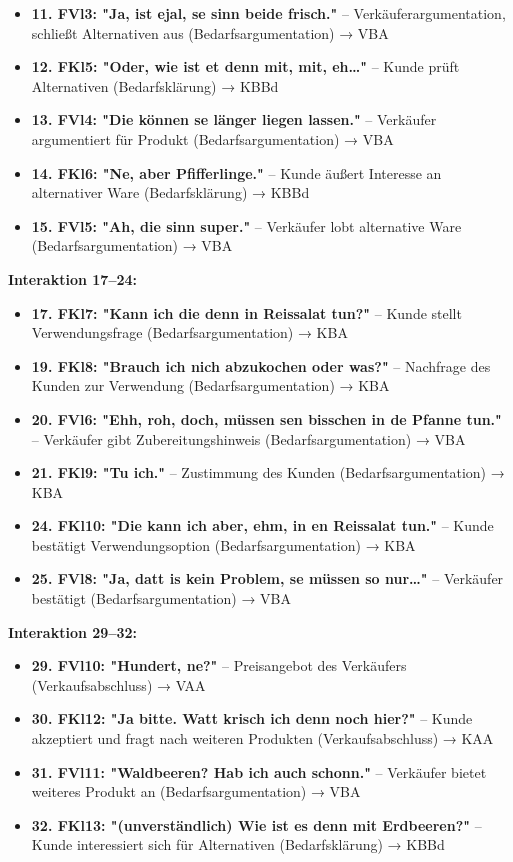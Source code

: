 \documentclass[
]{article}
\begin{document}
\begin{itemize}
\item
  \textbf{11. FVl3: "Ja, ist ejal, se sinn beide frisch."} --
  Verkäuferargumentation, schließt Alternativen aus
  (Bedarfsargumentation) → VBA
\item
  \textbf{12. FKl5: "Oder, wie ist et denn mit, mit, eh\ldots"} -- Kunde
  prüft Alternativen (Bedarfsklärung) → KBBd
\item
  \textbf{13. FVl4: "Die können se länger liegen lassen."} -- Verkäufer
  argumentiert für Produkt (Bedarfsargumentation) → VBA
\item
  \textbf{14. FKl6: "Ne, aber Pfifferlinge."} -- Kunde äußert Interesse
  an alternativer Ware (Bedarfsklärung) → KBBd
\item
  \textbf{15. FVl5: "Ah, die sinn super."} -- Verkäufer lobt alternative
  Ware (Bedarfsargumentation) → VBA
\end{itemize}

\textbf{Interaktion 17--24:}

\begin{itemize}
\item
  \textbf{17. FKl7: "Kann ich die denn in Reissalat tun?"} -- Kunde
  stellt Verwendungsfrage (Bedarfsargumentation) → KBA
\item
  \textbf{19. FKl8: "Brauch ich nich abzukochen oder was?"} -- Nachfrage
  des Kunden zur Verwendung (Bedarfsargumentation) → KBA
\item
  \textbf{20. FVl6: "Ehh, roh, doch, müssen se\textquotesingle n
  bisschen in de Pfanne tun."} -- Verkäufer gibt Zubereitungshinweis
  (Bedarfsargumentation) → VBA
\item
  \textbf{21. FKl9: "Tu ich."} -- Zustimmung des Kunden
  (Bedarfsargumentation) → KBA
\item
  \textbf{24. FKl10: "Die kann ich aber, ehm, in en Reissalat tun."} --
  Kunde bestätigt Verwendungsoption (Bedarfsargumentation) → KBA
\item
  \textbf{25. FVl8: "Ja, datt is kein Problem, se müssen so nur\ldots"}
  -- Verkäufer bestätigt (Bedarfsargumentation) → VBA
\end{itemize}

\textbf{Interaktion 29--32:}

\begin{itemize}
\item
  \textbf{29. FVl10: "Hundert, ne?"} -- Preisangebot des Verkäufers
  (Verkaufsabschluss) → VAA
\item
  \textbf{30. FKl12: "Ja bitte. Watt krisch ich denn noch hier?"} --
  Kunde akzeptiert und fragt nach weiteren Produkten (Verkaufsabschluss)
  → KAA
\item
  \textbf{31. FVl11: "Waldbeeren? Hab ich auch schonn."} -- Verkäufer
  bietet weiteres Produkt an (Bedarfsargumentation) → VBA
\item
  \textbf{32. FKl13: "(unverständlich) Wie ist es denn mit Erdbeeren?"}
  -- Kunde interessiert sich für Alternativen (Bedarfsklärung) → KBBd
\end{itemize}
\end{document}
